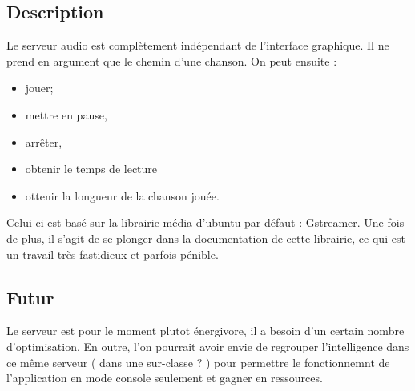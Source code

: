 \documentclass{report}
\begin{document}
\subsection*{Description}

Le serveur audio est complètement indépendant de l'interface graphique. Il ne prend en argument que le chemin d'une chanson. On peut ensuite :
\begin{itemize}
\item jouer;
\item mettre en pause,
\item arrêter,
\item obtenir le temps de lecture
\item ottenir la longueur de la chanson jouée.
\end{itemize}

Celui-ci est basé sur la librairie média d'ubuntu par défaut : Gstreamer. Une fois de plus, il s'agit de se plonger dans la documentation de cette librairie, ce qui est un travail très fastidieux et parfois pénible.

\subsection*{Futur}

Le serveur est pour le moment plutot énergivore, il a besoin d'un certain nombre d'optimisation. En outre, l'on pourrait avoir envie de regrouper l'intelligence dans ce même serveur ( dans une sur-classe ? ) pour permettre le fonctionnemnt de l'application en mode console seulement et gagner en ressources.
\end{document}
